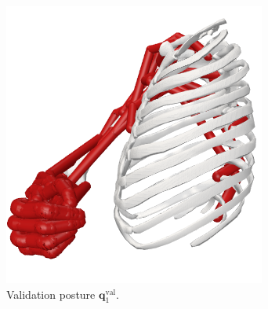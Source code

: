 \begin{figure}[!htb]
\begin{minipage}{0.3\linewidth}
        \centering
        \includegraphics[trim={0 0 0 0}, clip, width=0.6\linewidth]{img/chapter_4/pose_5_side.png}
    \end{minipage}
    \caption{Validation posture $\mathbf{q}_1^{\text{val}}$.}
    \label{fig:pose_val_1}
\end{figure}

